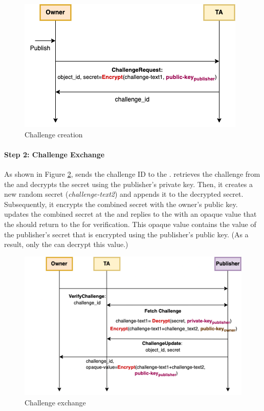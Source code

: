 \begin{figure}[htpb]
  \centering
  \includegraphics[scale=0.45]{challenge1.png}
  \caption{Challenge creation}
  \label{fig:challenge1}
\end{figure}

\paragraph{Step 2: Challenge Exchange} 

As shown in Figure \ref{fig:challenge2}, \owner sends the challenge ID to the \publisher. \Publisher retrieves the challenge from the \ta and decrypts the secret using the publisher's private key. Then, it creates a new random secret ({\em challenge-text2}) and appends it to the decrypted secret. Subsequently, it encrypts the combined secret with the owner's public key. \Publisher updates the combined secret at the \ta and replies to the \owner with an opaque value that the \owner should return to the \publisher for verification. This opaque value contains the value of the publisher's secret that is encrypted using the publisher's public key. (As a result, only the \publisher can decrypt this value.)

\begin{figure}[htbp]
  \centering
  \includegraphics[scale=0.45]{challenge2.png}
  \caption{Challenge exchange}
  \label{fig:challenge2}
\end{figure}

